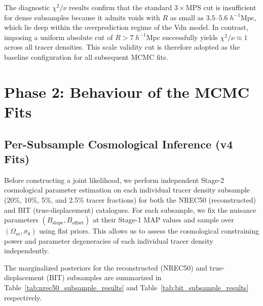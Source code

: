 \documentclass[12pt]{report}
\begin{document}
The diagnostic $\chi^2/\nu$ results confirm that the standard $3\times\mathrm{MPS}$ cut is insufficient for dense subsamples because it admits voids with $R$ as small as $3.5$--$5.6\;h^{-1}\mathrm{Mpc}$, which lie deep within the overprediction regime of the Vdn model. In contrast, imposing a uniform absolute cut of $R > 7\;h^{-1}\mathrm{Mpc}$ successfully yields $\chi^2/\nu \approx 1$ across all tracer densities. This scale validity cut is therefore adopted as the baseline configuration for all subsequent MCMC fits.

\section{Phase 2: Behaviour of the MCMC Fits}
\label{sec:results_mcmc}

\subsection{Per-Subsample Cosmological Inference (v4 Fits)}
\label{sec:per_subsample_mcmc}

Before constructing a joint likelihood, we perform independent Stage-2 cosmological parameter estimation on each individual tracer density subsample (20\%, 10\%, 5\%, and 2.5\% tracer fractions) for both the NREC50 (reconstructed) and BIT (true-displacement) catalogues. For each subsample, we fix the nuisance parameters $(B_{\mathrm{slope}}, B_{\mathrm{offset}})$ at their Stage-1 MAP values and sample over $(\Omega_m, \sigma_8)$ using flat priors. This allows us to assess the cosmological constraining power and parameter degeneracies of each individual tracer density independently.

The marginalized posteriors for the reconstructed (NREC50) and true-displacement (BIT) subsamples are summarized in Table~\ref{tab:nrec50_subsample_results} and Table~\ref{tab:bit_subsample_results} respectively.
\end{document}
